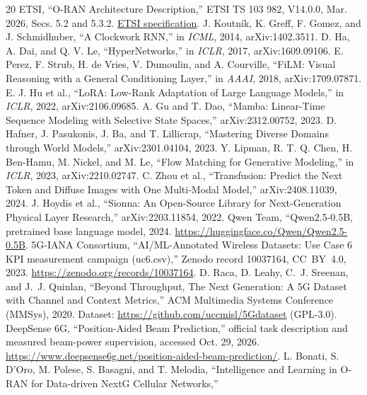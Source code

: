 \documentclass[10pt,twocolumn]{article}
\begin{document}
\begin{thebibliography}{20}
 ETSI, ``O-RAN Architecture Description,'' ETSI TS 103 982,
V14.0.0, Mar. 2026, Secs. 5.2 and 5.3.2.
\href{https://www.etsi.org/deliver/etsi_ts/103900_103999/103982/14.00.00_60/ts_103982v140000p.pdf}{ETSI specification}.
 J. Koutn\'ik, K. Greff, F. Gomez, and J. Schmidhuber,
``A Clockwork RNN,'' in \emph{ICML}, 2014, arXiv:1402.3511.
 D. Ha, A. Dai, and Q. V. Le, ``HyperNetworks,''
in \emph{ICLR}, 2017, arXiv:1609.09106.
 E. Perez, F. Strub, H. de Vries, V. Dumoulin, and A. Courville,
``FiLM: Visual Reasoning with a General Conditioning Layer,''
in \emph{AAAI}, 2018, arXiv:1709.07871.
 E. J. Hu et al., ``LoRA: Low-Rank Adaptation of Large Language
Models,'' in \emph{ICLR}, 2022, arXiv:2106.09685.
 A. Gu and T. Dao, ``Mamba: Linear-Time Sequence Modeling with
Selective State Spaces,'' arXiv:2312.00752, 2023.
 D. Hafner, J. Pasukonis, J. Ba, and T. Lillicrap,
``Mastering Diverse Domains through World Models,'' arXiv:2301.04104, 2023.
 Y. Lipman, R. T. Q. Chen, H. Ben-Hamu, M. Nickel, and M. Le,
``Flow Matching for Generative Modeling,'' in \emph{ICLR}, 2023,
arXiv:2210.02747.
 C. Zhou et al., ``Transfusion: Predict the Next Token and Diffuse
Images with One Multi-Modal Model,'' arXiv:2408.11039, 2024.
 J. Hoydis et al., ``Sionna: An Open-Source Library for
Next-Generation Physical Layer Research,'' arXiv:2203.11854, 2022.
 Qwen Team, ``Qwen2.5-0.5B, pretrained base language model,
2024. \url{https://huggingface.co/Qwen/Qwen2.5-0.5B}.
 5G-IANA Consortium, ``AI/ML-Annotated Wireless Datasets:
Use Case 6 KPI measurement campaign (uc6.csv),'' Zenodo record 10037164,
CC~BY~4.0, 2023. \url{https://zenodo.org/records/10037164}.
 D. Raca, D. Leahy, C.~J. Sreenan, and J.~J. Quinlan,
``Beyond Throughput, The Next Generation: A 5G Dataset with Channel and
Context Metrics,'' ACM Multimedia Systems Conference (MMSys), 2020.
Dataset: \url{https://github.com/uccmisl/5Gdataset} (GPL-3.0).
 DeepSense 6G, ``Position-Aided Beam Prediction,''
official task description and measured beam-power supervision, accessed
Oct. 29, 2026. \url{https://www.deepsense6g.net/position-aided-beam-prediction/}.
 L. Bonati, S. D'Oro, M. Polese, S. Basagni, and T. Melodia,
``Intelligence and Learning in O-RAN for Data-driven NextG Cellular Networks,''

\end{thebibliography}
\end{document}
